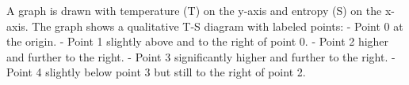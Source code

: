 A graph is drawn with temperature (T) on the y-axis and entropy (S) on the x-axis. The graph shows a qualitative T-S diagram with labeled points:  
- Point 0 at the origin.  
- Point 1 slightly above and to the right of point 0.  
- Point 2 higher and further to the right.  
- Point 3 significantly higher and further to the right.  
- Point 4 slightly below point 3 but still to the right of point 2.
